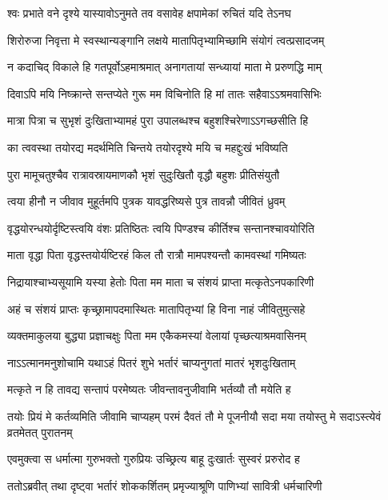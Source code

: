 \begin{center}
\twolineshloka
{श्वः प्रभाते वने दृश्ये यास्यावोऽनुमते तव}
{वसावेह क्षपामेकां रुचितं यदि तेऽनघ}


\twolineshloka
{शिरोरुजा निवृत्ता मे स्वस्थान्यङ्गानि लक्षये}
{मातापितृभ्यामिच्छामि संयोगं त्वत्प्रसादजम्}

\twolineshloka
{न कदाचिद् विकाले हि गतपूर्वोऽहमाश्रमात्}
{अनागतायां सन्ध्यायां माता मे प्ररुणद्धि माम्}

\twolineshloka
{दिवाऽपि मयि निष्क्रान्ते सन्तप्येते गुरू मम}
{विचिनोति हि मां तातः सहैवाऽऽश्रमवासिभिः}

\twolineshloka
{मात्रा पित्रा च सुभृशं दुःखिताभ्यामहं पुरा}
{उपालब्धश्च बहुशश्चिरेणाऽऽगच्छसीति हि}

\twolineshloka
{का त्ववस्था तयोरद्य मदर्थमिति चिन्तये}
{तयोरदृश्ये मयि च महद्दुःखं भविष्यति}

\twolineshloka
{पुरा मामूचतुश्चैव रात्रावस्रायमाणकौ}
{भृशं सुदुःखितौ वृद्धौ बहुशः प्रीतिसंयुतौ}

\twolineshloka
{त्वया हीनौ न जीवाव मुहूर्तमपि पुत्रक}
{यावद्धरिष्यसे पुत्र तावन्नौ जीवितं ध्रुवम्}

\twolineshloka
{वृद्धयोरन्धयोर्दृष्टिस्त्वयि वंशः प्रतिष्ठितः}
{त्वयि पिण्डश्च कीर्तिश्च सन्तानश्चावयोरिति}

\twolineshloka
{माता वृद्धा पिता वृद्धस्तयोर्यष्टिरहं किल}
{तौ रात्रौ मामपश्यन्तौ कामवस्थां गमिष्यतः}

\twolineshloka
{निद्रायाश्चाभ्यसूयामि यस्या हेतोः पिता मम}
{माता च संशयं प्राप्ता मत्कृतेऽनपकारिणी}

\twolineshloka
{अहं च संशयं प्राप्तः कृच्छ्रामापदमास्थितः}
{मातापितृभ्यां हि विना नाहं जीवितुमुत्सहे}

\twolineshloka
{व्यक्तमाकुलया बुद्ध्या प्रज्ञाचक्षुः पिता मम}
{एकैकमस्यां वेलायां पृच्छत्याश्रमवासिनम्}

\twolineshloka
{नाऽऽत्मानमनुशोचामि यथाऽहं पितरं शुभे}
{भर्तारं चाप्यनुगतां मातरं भृशदुःखिताम्}

\twolineshloka
{मत्कृते न हि तावद्य सन्तापं परमेष्यतः}
{जीवन्तावनुजीवामि भर्तव्यौ तौ मयेति ह}

\threelineshloka
{तयोः प्रियं मे कर्तव्यमिति जीवामि चाप्यहम्}
{परमं दैवतं तौ मे पूजनीयौ सदा मया}
{तयोस्तु मे सदाऽस्त्येवं  व्रतमेतत् पुरातनम्}


\twolineshloka
{एवमुक्त्वा स धर्मात्मा गुरुभक्तो गुरुप्रियः}
{उच्छ्रित्य बाहू दुःखार्तः सुस्वरं प्ररुरोद ह}

\twolineshloka
{ततोऽब्रवीत् तथा दृष्ट्वा भर्तारं शोककर्शितम्}
{प्रमृज्याश्रूणि पाणिभ्यां सावित्री धर्मचारिणी}


\end{center}
